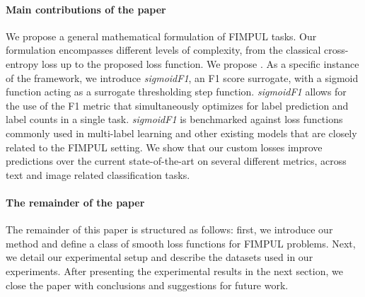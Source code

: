 \paragraph{Main contributions of the paper}
We propose a general mathematical formulation of FIMPUL tasks. 
Our formulation encompasses different levels of complexity, from the classical cross-entropy loss up to the proposed loss function. We propose \solution. As a specific instance of the framework, we introduce \emph{sigmoidF1}, an F1 score surrogate, with a sigmoid function acting as a surrogate thresholding step function. 
\emph{sigmoidF1} allows for the use of the F1 metric that simultaneously optimizes for label prediction and label counts in a single task.  
\emph{sigmoidF1} is benchmarked against loss functions commonly used in multi-label learning and other existing models that are closely related to the FIMPUL setting. We show that our custom losses improve predictions over the current state-of-the-art on several different metrics, across text and image related classification tasks. 

\paragraph{The remainder of the paper}
The remainder of this paper is structured as follows: first, we introduce our method and define a class of smooth loss functions for FIMPUL problems. Next, we detail our experimental setup and describe the datasets used in our experiments. After presenting the experimental results in the next section, we close the paper with conclusions and suggestions for future work.



